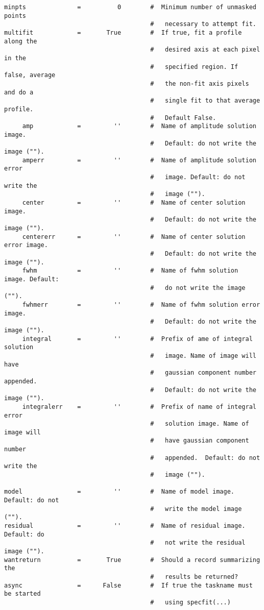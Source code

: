 \begin{verbatim}
minpts              =          0        #  Minimum number of unmasked points
                                        #   necessary to attempt fit.
multifit            =       True        #  If true, fit a profile along the
                                        #   desired axis at each pixel in the
                                        #   specified region. If false, average
                                        #   the non-fit axis pixels and do a
                                        #   single fit to that average profile.
                                        #   Default False.
     amp            =         ''        #  Name of amplitude solution image.
                                        #   Default: do not write the image ("").
     amperr         =         ''        #  Name of amplitude solution error
                                        #   image. Default: do not write the
                                        #   image ("").
     center         =         ''        #  Name of center solution image.
                                        #   Default: do not write the image ("").
     centererr      =         ''        #  Name of center solution error image.
                                        #   Default: do not write the image ("").
     fwhm           =         ''        #  Name of fwhm solution image. Default:
                                        #   do not write the image ("").
     fwhmerr        =         ''        #  Name of fwhm solution error image.
                                        #   Default: do not write the image ("").
     integral       =         ''        #  Prefix of ame of integral solution
                                        #   image. Name of image will have
                                        #   gaussian component number appended.
                                        #   Default: do not write the image ("").
     integralerr    =         ''        #  Prefix of name of integral error
                                        #   solution image. Name of image will
                                        #   have gaussian component number
                                        #   appended.  Default: do not write the
                                        #   image ("").

model               =         ''        #  Name of model image. Default: do not
                                        #   write the model image ("").
residual            =         ''        #  Name of residual image. Default: do
                                        #   not write the residual image ("").
wantreturn          =       True        #  Should a record summarizing the
                                        #   results be returned?
async               =      False        #  If true the taskname must be started
                                        #   using specfit(...)
\end{verbatim}
\normalsize

